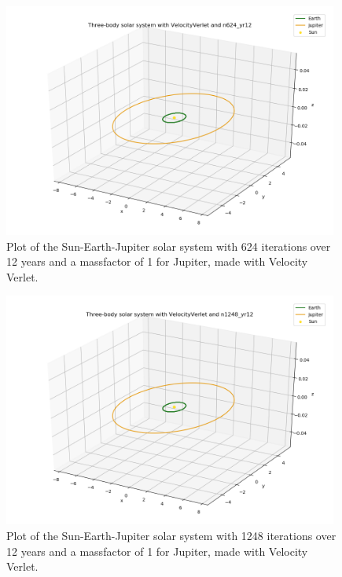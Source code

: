 \documentclass{article}
\begin{document}
    \begin{figure}[H]
        \centering
        \includegraphics[width = 11cm]{img/plot3D_S_E_J_V_n624_yr12.png}
        \caption{Plot of the Sun-Earth-Jupiter solar system with 624 iterations over 12 years and a massfactor of 1 for Jupiter, made with Velocity Verlet.}
        \label{fig:plot3D_S_E_J_V_624_yr12}
    \end{figure}

    \begin{figure}[H]
        \centering
        \includegraphics[width = 11cm]{img/plot3D_S_E_J_V_n1248_yr12.png}
        \caption{Plot of the Sun-Earth-Jupiter solar system with 1248 iterations over 12 years and a massfactor of 1 for Jupiter, made with Velocity Verlet.}
        \label{fig:plot3D_S_E_J_V_n1248_yr12}
    \end{figure}
\end{document}
